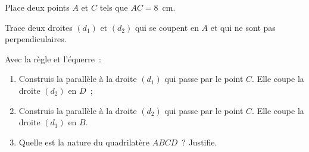 \begin{myenumerate}
  \item Place deux points $A$ et $C$ tels que $AC=8$~cm.
  \item Trace deux droites $(d_1)$ et $(d_2)$ qui se coupent en $A$ et qui ne sont pas perpendiculaires.
  \item  Avec la règle et l'équerre :
\begin{enumerate}
\item Construis la parallèle à la droite $(d_1)$ qui passe par le point $C$. Elle coupe la droite $(d_2)$ en $D$ ;
\item Construis la parallèle à la droite $(d_2)$ qui passe par le point $C$. Elle coupe la droite $(d_1)$ en $B$.
\item Quelle est la nature du quadrilatère $ABCD$ ? Justifie.
\end{enumerate}
\end{myenumerate}